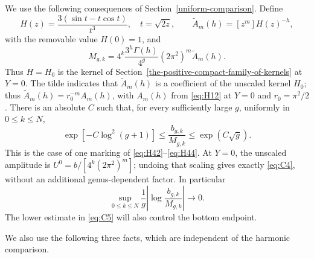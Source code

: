 We use the following consequences of Section~\ref{uniform-comparison}.
Define \[
 H(z)=\frac{3(\sin t-t\cos t)}{t^3},\quad t=\sqrt{2z},
 \qquad \widetilde A_m(h)=[z^m]H(z)^{-h},
\] with the removable value \(H(0)=1\), and \begin{equation}
M_{g,k}=4^k\frac{3^h\Gamma(h)}{4^g}
                  (2\pi^2)^m \widetilde A_m(h).
 \label{eq:C4}
\end{equation} Thus \(H=H_0\) is the kernel of Section~\ref{the-positive-compact-family-of-kernels}
at \(Y=0\). The tilde indicates that \(\widetilde A_m(h)\) is a coefficient of the
unscaled kernel \(H_0\); thus \(\widetilde A_m(h)=r_0^{-m}A_m(h)\), with
\(A_m(h)\) from \eqref{eq:H12} at \(Y=0\) and \(r_0=\pi^2/2\).
There is an absolute \(C\) such that, for every sufficiently large
\(g\), uniformly in \(0\le k\le N\), \begin{equation}
\exp[-C\log^2(g+1)]
 \le\frac{b_{g,k}}{M_{g,k}}
 \le\exp(C\sqrt g).
 \label{eq:C5}
\end{equation} This is the case of one marking of
\eqref{eq:H42}--\eqref{eq:H44}. At \(Y=0\), the unscaled amplitude is
\(U^0=b/[4^k(2\pi^2)^m]\); undoing that scaling gives exactly
\eqref{eq:C4}, without an additional genus-dependent factor. In particular \begin{equation}
\sup_{0\le k\le N}\frac1g
       \left|\log\frac{b_{g,k}}{M_{g,k}}\right|\longrightarrow0.
 \label{eq:C6}
\end{equation} The lower estimate in \eqref{eq:C5} will also control the bottom endpoint.

We also use the following three facts, which are independent of the
harmonic comparison.

